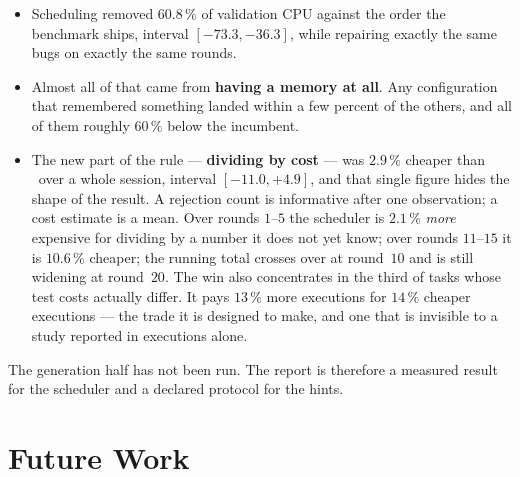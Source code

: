 \begin{itemize}[leftmargin=*,itemsep=4pt]
\item Scheduling removed $\mathbf{60.8\,\%}$ of validation CPU against the
order the benchmark ships, interval $[-73.3, -36.3]$, while repairing exactly
the same bugs on exactly the same rounds.
\item Almost all of that came from \textbf{having a memory at all}. Any
configuration that remembered something landed within a few percent of the
others, and all of them roughly $60\,\%$ below the incumbent.
\item The new part of the rule --- \textbf{dividing by cost} --- was $2.9\,\%$
cheaper than \frtp\ over a whole session, interval $[-11.0, +4.9]$, and that
single figure hides the shape of the result. A rejection count is informative
after one observation; a cost estimate is a mean. Over rounds $1$--$5$ the
scheduler is $2.1\,\%$ \emph{more} expensive for dividing by a number it does
not yet know; over rounds $11$--$15$ it is $10.6\,\%$ cheaper; the running
total crosses over at round~$10$ and is still widening at round~$20$. The win
also concentrates in the third of tasks whose test costs actually differ. It
pays $13\,\%$ more executions for $14\,\%$ cheaper executions --- the trade it
is designed to make, and one that is invisible to a study reported in
executions alone.
\end{itemize}

The generation half has not been run. The report is therefore a measured result
for the scheduler and a declared protocol for the hints.

\section{Future Work}
\label{sec:future}

